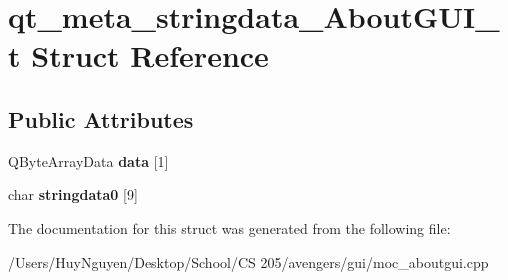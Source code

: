 \hypertarget{structqt__meta__stringdata__AboutGUI__t}{}\section{qt\+\_\+meta\+\_\+stringdata\+\_\+\+About\+G\+U\+I\+\_\+t Struct Reference}
\label{structqt__meta__stringdata__AboutGUI__t}
\subsection*{Public Attributes}
\begin{DoxyCompactItemize}
\item 
Q\+Byte\+Array\+Data {\bfseries data} \mbox{[}1\mbox{]}\hypertarget{structqt__meta__stringdata__AboutGUI__t_a773fb36665573ca26e27388e71b13806}{}\label{structqt__meta__stringdata__AboutGUI__t_a773fb36665573ca26e27388e71b13806}

\item 
char {\bfseries stringdata0} \mbox{[}9\mbox{]}\hypertarget{structqt__meta__stringdata__AboutGUI__t_ad2293d45b5600de35e0994c99b146482}{}\label{structqt__meta__stringdata__AboutGUI__t_ad2293d45b5600de35e0994c99b146482}

\end{DoxyCompactItemize}


The documentation for this struct was generated from the following file\+:\begin{DoxyCompactItemize}
\item 
/\+Users/\+Huy\+Nguyen/\+Desktop/\+School/\+C\+S 205/avengers/gui/moc\+\_\+aboutgui.\+cpp\end{DoxyCompactItemize}
